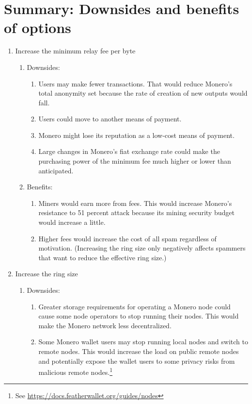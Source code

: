 \documentclass[english]{article}
\begin{document}
\section{Summary: Downsides and benefits of options}
\begin{enumerate}
\item Increase the minimum relay fee per byte
\begin{enumerate}
\item Downsides:
\begin{enumerate}
\item Users may make fewer transactions. That would reduce Monero's total
anonymity set because the rate of creation of new outputs would fall.
\item Users could move to another means of payment.
\item Monero might lose its reputation as a low-cost means of payment.
\item Large changes in Monero's fiat exchange rate could make the purchasing
power of the minimum fee much higher or lower than anticipated.
\end{enumerate}
\item Benefits:
\begin{enumerate}
\item Miners would earn more from fees. This would increase Monero's resistance
to 51 percent attack because its mining security budget would increase
a little.
\item Higher fees would increase the cost of all spam regardless of motivation.
(Increasing the ring size only negatively affects spammers that want
to reduce the effective ring size.)
\end{enumerate}
\end{enumerate}
\item Increase the ring size
\begin{enumerate}
\item Downsides:
\begin{enumerate}
\item Greater storage requirements for operating a Monero node could cause
some node operators to stop running their nodes. This would make the
Monero network less decentralized.
\item Some Monero wallet users may stop running local nodes and switch to
remote nodes. This would increase the load on public remote nodes
and potentially expose the wallet users to some privacy risks from
malicious remote nodes.\footnote{See \url{https://docs.featherwallet.org/guides/nodes}}

\end{enumerate}
\end{enumerate}
\end{enumerate}
\end{document}
